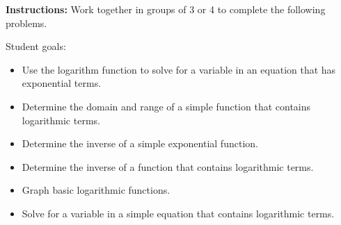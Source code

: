



\noindent \textbf{Instructions:} Work together in groups of 3 or 4 to
complete the following problems.

Student goals:
  \begin{itemize}
  \item Use the logarithm function to solve for a variable in an
    equation that has exponential terms.
  \item Determine the domain and range of a simple function that
    contains logarithmic terms.
  \item Determine the inverse of a simple exponential function.
  \item Determine the inverse of a function that contains logarithmic terms.
  \item Graph basic logarithmic functions.
  \item Solve for a variable in a simple equation that contains logarithmic
    terms.
  \end{itemize}



